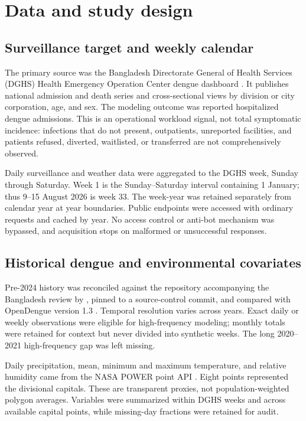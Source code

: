 \documentclass[11pt]{article}
\begin{document}
\section{Data and study design}

\subsection{Surveillance target and weekly calendar}

The primary source was the Bangladesh Directorate General of Health Services (DGHS) Health Emergency Operation Center dengue dashboard \citep{dghsDashboard}. It publishes national admission and death series and cross-sectional views by division or city corporation, age, and sex. The modeling outcome was reported hospitalized dengue admissions. This is an operational workload signal, not total symptomatic incidence: infections that do not present, outpatients, unreported facilities, and patients refused, diverted, waitlisted, or transferred are not comprehensively observed.

Daily surveillance and weather data were aggregated to the DGHS week, Sunday through Saturday. Week 1 is the Sunday--Saturday interval containing 1 January; thus 9--15 August 2026 is week 33. The week-year was retained separately from calendar year at year boundaries. Public endpoints were accessed with ordinary requests and cached by year. No access control or anti-bot mechanism was bypassed, and acquisition stops on malformed or unsuccessful responses.

\subsection{Historical dengue and environmental covariates}

Pre-2024 history was reconciled against the repository accompanying the Bangladesh review by \citet{bhowmik2026}, pinned to a source-control commit, and compared with OpenDengue version 1.3 \citep{clarke2024,opendengue2025}. Temporal resolution varies across years. Exact daily or weekly observations were eligible for high-frequency modeling; monthly totals were retained for context but never divided into synthetic weeks. The long 2020--2021 high-frequency gap was left missing.

Daily precipitation, mean, minimum and maximum temperature, and relative humidity came from the NASA POWER point API \citep{nasaPower}. Eight points represented the divisional capitals. These are transparent proxies, not population-weighted polygon averages. Variables were summarized within DGHS weeks and across available capital points, while missing-day fractions were retained for audit.
\end{document}
